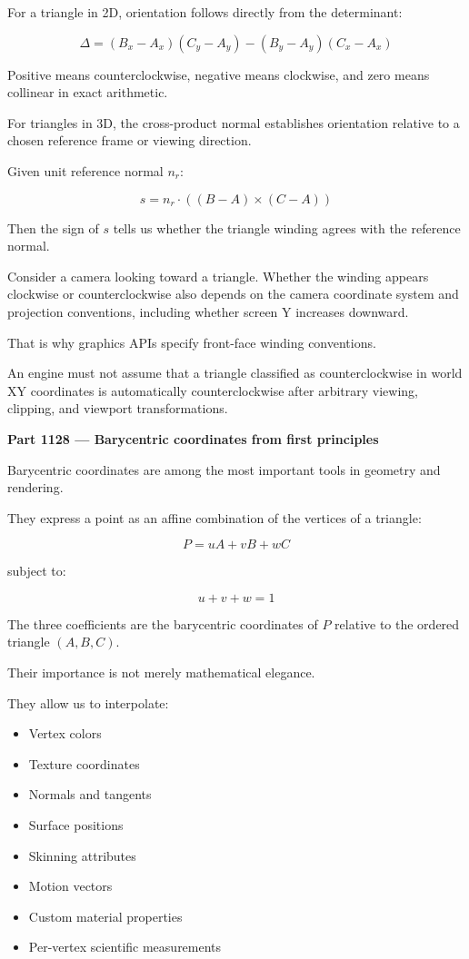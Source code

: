 For a triangle in 2D, orientation follows directly from the determinant:

\[
\Delta= (B_x-A_x)(C_y-A_y) - (B_y-A_y)(C_x-A_x)
\]

Positive means counterclockwise, negative means clockwise, and zero means collinear in exact arithmetic.

For triangles in 3D, the cross-product normal establishes orientation relative to a chosen reference frame or viewing direction.

Given unit reference normal \(n_r\):

\[
s=n_r\cdot((B-A)\times(C-A))
\]

Then the sign of \(s\) tells us whether the triangle winding agrees with the reference normal.

Consider a camera looking toward a triangle. Whether the winding appears clockwise or counterclockwise also depends on the camera coordinate system and projection conventions, including whether screen Y increases downward.

That is why graphics APIs specify front-face winding conventions.

An engine must not assume that a triangle classified as counterclockwise in world XY coordinates is automatically counterclockwise after arbitrary viewing, clipping, and viewport transformations.

\textbf{Part 1128 --- Barycentric coordinates from first principles}

Barycentric coordinates are among the most important tools in geometry and rendering.

They express a point as an affine combination of the vertices of a triangle:

\[
\boxed{ P=uA+vB+wC }
\]

subject to:

\[
\boxed{u+v+w=1}
\]

The three coefficients are the barycentric coordinates of \(P\) relative to the ordered triangle \((A,B,C)\).

Their importance is not merely mathematical elegance.

They allow us to interpolate:

\begin{itemize}
\tightlist
\item
  Vertex colors
\item
  Texture coordinates
\item
  Normals and tangents
\item
  Surface positions
\item
  Skinning attributes
\item
  Motion vectors
\item
  Custom material properties
\item
  Per-vertex scientific measurements
\end{itemize}

